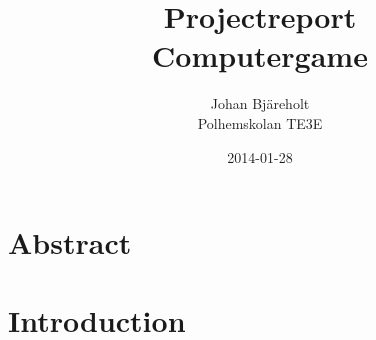\documentclass[a4paper,12pt]{article}
\begin{document}
\title{Projectreport\\ 
       \small{Computergame}}
\author{Johan Bjäreholt\\
       \small{Polhemskolan TE3E}}
\date{2014-01-28}

\maketitle

\newpage

\section{Abstract}




\clearpage


\setcounter{tocdepth}{3}
\tableofcontents
 
\clearpage

\section{Introduction}
\end{document}
